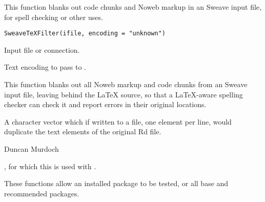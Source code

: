 %
\begin{Description}\relax
This function blanks out code chunks and Noweb markup in an Sweave input file, 
for spell checking or other uses.
\end{Description}
%
\begin{Usage}
\begin{verbatim}
SweaveTeXFilter(ifile, encoding = "unknown")
\end{verbatim}
\end{Usage}
%
\begin{Arguments}
\begin{ldescription}
\item[\code{ifile}] 
Input file or connection.

\item[\code{encoding}] 
Text encoding to pass to .

\end{ldescription}
\end{Arguments}
%
\begin{Details}\relax
This function blanks out all Noweb markup and code chunks from an Sweave input 
file, leaving behind the LaTeX source, so that a LaTeX-aware spelling checker
can check it and report errors in their original locations.
\end{Details}
%
\begin{Value}
A character vector which if written to a file, one element per line, would 
duplicate the text elements of the original Rd file.
\end{Value}
%
\begin{Author}\relax
Duncan Murdoch
\end{Author}
%
\begin{SeeAlso}\relax
{}, for which this is used with .
\end{SeeAlso}
%
\begin{Description}\relax
These functions allow an installed package to be tested, or all base
and recommended packages.
\end{Description}

